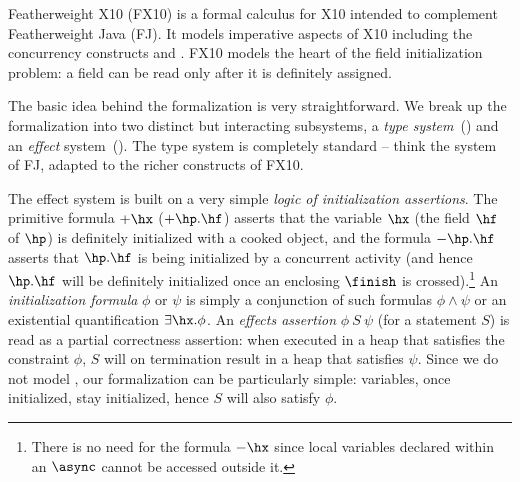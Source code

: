 Featherweight X10 (FX10) is a formal calculus for X10 intended to  complement Featherweight Java
(FJ).  It models imperative aspects of X10 including the concurrency
constructs \finish{} and \async{}.
FX10 models the heart of the field initialization problem:
    a field can be read only after it  is definitely assigned.


The basic idea behind the formalization is very straightforward. We
break up the formalization into two distinct but interacting
subsystems, a {\em type system}~() and an {\em
  effect} system~(). The type
system is completely standard -- think the system of FJ, adapted to
the richer constructs of FX10.

The effect system is built on a very simple {\em logic of
  initialization assertions}.  The primitive formula $+\hx$
($+\hp.\hf$) asserts that the variable $\hx$ (the field $\hf$ of
$\hp$) is definitely initialized with a cooked object, and the formula
$-\hp.\hf$ asserts that $\hp.\hf$ is being initialized by a concurrent
activity (and hence $\hp.\hf$ will be definitely initialized once an
enclosing $\finish$ is crossed).\footnote{There is no need for the
  formula $-\hx$ since local variables declared within an $\async$
  cannot be accessed outside it.}  An {\em initialization formula}
$\phi$ or $\psi$ is simply a conjunction of such formulas $\phi \wedge
\psi$ or an existential quantification $\exists{}\hx.\phi$.
An {\em
  effects assertion} $\phi~S~\psi$ (for a statement $S$) is read as a
partial correctness assertion: when executed in a heap that satisfies
the constraint $\phi$, $S$ will on termination result in a heap that
satisfies $\psi$.  Since we do not model , our
formalization can be particularly simple: variables, once initialized,
stay initialized, hence $S$ will also satisfy $\phi$.

